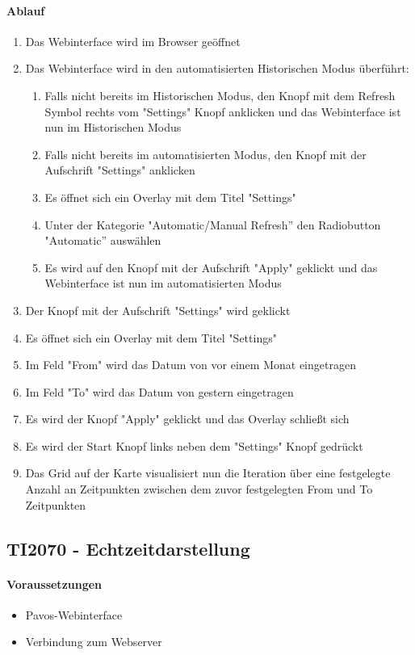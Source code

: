 \paragraph{Ablauf}
\begin{enumerate}
\item Das Webinterface wird im Browser geöffnet
\item Das Webinterface wird in den automatisierten Historischen Modus überführt:
\begin{enumerate}
\item Falls nicht bereits im Historischen Modus, den Knopf mit dem Refresh Symbol rechts vom "Settings" Knopf anklicken und das Webinterface ist nun im Historischen Modus
\item Falls nicht bereits im automatisierten Modus, den Knopf mit der Aufschrift "Settings" anklicken
\item Es öffnet sich ein Overlay mit dem Titel "Settings"
\item Unter der Kategorie "Automatic/Manual Refresh'' den Radiobutton "Automatic'' auswählen
\item Es wird auf den Knopf mit der Aufschrift "Apply" geklickt und das Webinterface ist nun im automatisierten Modus
\end{enumerate}
\item Der Knopf mit der Aufschrift "Settings" wird geklickt
\item Es öffnet sich ein Overlay mit dem Titel "Settings"
\item Im Feld "From" wird das Datum von vor einem Monat eingetragen
\item Im Feld "To" wird das Datum von gestern eingetragen
\item Es wird der Knopf "Apply" geklickt und das Overlay schließt sich
\item Es wird der Start Knopf links neben dem "Settings" Knopf gedrückt
\item Das Grid auf der Karte visualisiert nun die Iteration über eine festgelegte Anzahl an Zeitpunkten zwischen dem zuvor festgelegten From und To Zeitpunkten
\end{enumerate}
\szenarioGood

\subsection{TI2070 - Echtzeitdarstellung}
\paragraph{Voraussetzungen}
\begin{itemize}
\item Pavos-Webinterface
\item Verbindung zum Webserver
\end{itemize}
